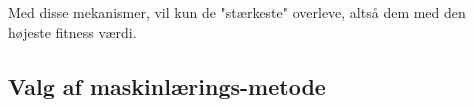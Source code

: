 \\\\
Med disse mekanismer, vil kun de "stærkeste" overleve, altså dem med den højeste fitness værdi. 


\subsection{Valg af maskinlærings-metode}






















































